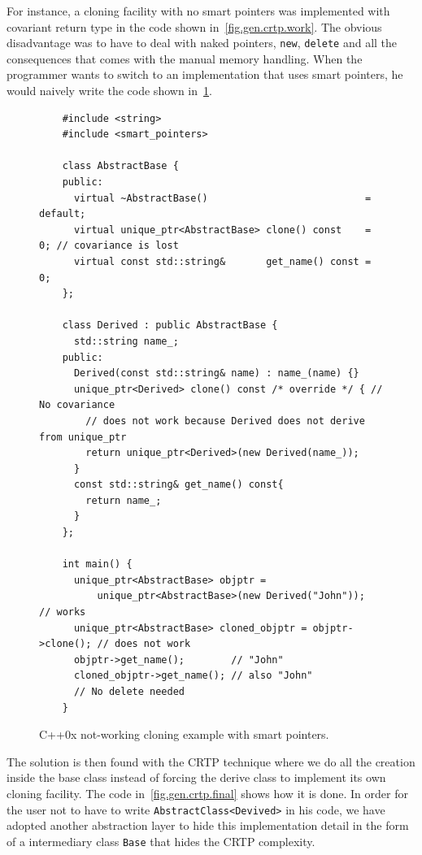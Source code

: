 For instance, a cloning facility with no smart pointers was implemented with covariant return type in the code shown
in~\cref{fig.gen.crtp.work}. The obvious disadvantage was to have to deal with naked pointers, \texttt{new},
\texttt{delete} and all the consequences that comes with the manual memory handling. When the programmer wants to switch
to an implementation that uses smart pointers, he would naively write the code shown in~\cref{fig.gen.crtp.dontwork}.

\begin{figure}[tbh]
  \centering
  \begin{verbatim}
    #include <string>
    #include <smart_pointers>

    class AbstractBase {
    public:
      virtual ~AbstractBase()                           = default;
      virtual unique_ptr<AbstractBase> clone() const    = 0; // covariance is lost
      virtual const std::string&       get_name() const = 0;
    };

    class Derived : public AbstractBase {
      std::string name_;
    public:
      Derived(const std::string& name) : name_(name) {}
      unique_ptr<Derived> clone() const /* override */ { // No covariance
        // does not work because Derived does not derive from unique_ptr
        return unique_ptr<Derived>(new Derived(name_)); 
      }
      const std::string& get_name() const{
        return name_;
      }
    };

    int main() {
      unique_ptr<AbstractBase> objptr =
          unique_ptr<AbstractBase>(new Derived("John"));        // works
      unique_ptr<AbstractBase> cloned_objptr = objptr->clone(); // does not work
      objptr->get_name();        // "John"
      cloned_objptr->get_name(); // also "John"
      // No delete needed
    }
  \end{verbatim}
  \caption{C++0x not-working cloning example with smart pointers.}
  \label{fig.gen.crtp.dontwork}
\end{figure}

The solution is then found with the CRTP technique where we do all the creation inside the base class instead of forcing
the derive class to implement its own cloning facility. The code in~\cref{fig.gen.crtp.final} shows how it is done. In
order for the user not to have to write \texttt{AbstractClass<Devived>} in his code, we have adopted another abstraction
layer to hide this implementation detail in the form of a intermediary class \texttt{Base} that hides the CRTP
complexity.


